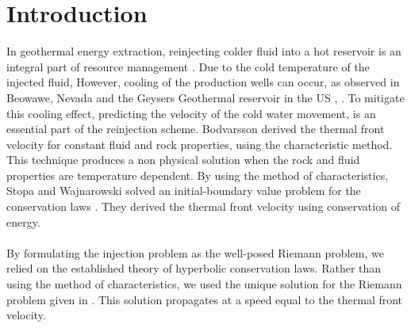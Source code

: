 \section{Introduction}
In geothermal energy extraction, reinjecting  colder fluid into a hot reservoir is an integral part of resource management \cite{Ax-R08, Ax-Production08}. Due to the cold temperature of the injected fluid, However, cooling of the production wells can occur, as observed in Beowawe, Nevada and the Geysers Geothermal reservoir in the US  \cite{Beall}, \cite{Ben}. To mitigate this cooling effect, predicting the velocity of the cold water movement, is an essential part of the reinjection scheme. Bodvarsson \cite{Bod-R72} derived the thermal front velocity for constant fluid and rock properties, using the characteristic method. This technique produces a non physical solution when the rock and fluid properties are temperature dependent.  By using the method of characteristics, Stopa and Wajnarowski solved an initial-boundary value problem for the conservation laws \cite{Waj05}. They derived the thermal front velocity using conservation of energy. \\
\\
By formulating the injection problem as the well-posed Riemann problem, we relied on the established theory of hyperbolic conservation laws. Rather than using the method of characteristics, we used the unique solution for the Riemann problem given in \cite{Risebro07}. This solution propagates at a speed equal to the thermal front velocity.

